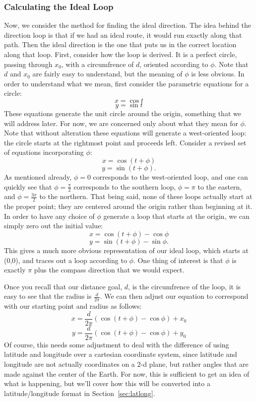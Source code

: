\documentclass[twocolumn,12pt]{article}
\begin{document}
\subsubsection{Calculating the Ideal Loop}

Now, we consider the method for finding the ideal direction. The idea behind the
direction loop is that if we had an ideal route, it would run exactly along that
path. Then the ideal direction is the one that puts us in the correct location
along that loop. First, consider how the loop is derived. It is a perfect
circle, passing through $x_0$, with a circumfrence of $d$, oriented according to
$\phi$. Note that $d$ and $x_0$ are fairly easy to understand, but the meaning
 of $\phi$ is less obvious. In order to understand what we mean, first consider
the parametric equations for a circle:
\[ x = \cos t \]
\[ y = \sin t \]
These equations generate the unit circle around the origin, something that we
will address later. For now, we are concerned only about what they mean for
$\phi$. Note that without alteration these equations will generate a
west-oriented loop: the circle starts at the rightmost point and proceeds left.
Consider a revised set of equations incorporating $\phi$:
\[ x = \cos (t + \phi) \]
\[ y = \sin (t + \phi). \]
As mentioned already, $\phi = 0$ corresponds to the west-oriented loop, and one
can quickly see that $\phi = \frac{\pi}{2}$ corresponds to the southern loop,
$\phi = \pi$ to the eastern, and $\phi = \frac{3\pi}{2}$ to the northern. That
being said, none of these loops actually start at the proper point; they are
centered around the origin rather than beginning at it. In order to have any
choice of $\phi$ generate a loop that starts at the origin, we can simply zero
out the initial value:
\[ x = \cos (t + \phi) - \cos \phi \]
\[ y = \sin ( t + \phi ) - \sin \phi. \]
This gives a much more obvious representation of our ideal loop, which starts
at (0,0), and traces out a loop according to $\phi$. One thing of interest is
that $\phi$ is exactly $\pi$ plus the compass direction that we would expect.

Once you recall that our distance goal, $d$, is the circumfrence of the loop,
it is easy to see that the radius is $\frac{d}{2\pi}$. We can then adjust our
equation to correspond with our starting point and radius as follows:
\[ x = \frac{d}{2\pi}(\cos ( t + \phi ) - \cos \phi ) + x_0 \]
\[ y = \frac{d}{2\pi}(\cos ( t + \phi ) - \cos \phi ) + y_0 \]
Of course, this needs some adjustment to deal with the difference of using
latitude and longitude over a cartesian coordinate system, since latitude
and longitude are not actually coordinates on a 2-d plane, but rather angles
that are made against the center of the Earth. For now, this is sufficient to
get an idea of what is happening, but we'll cover how this will be converted
into a latitude/longitude format in Section~\ref{sec:latlong}.
\end{document}
